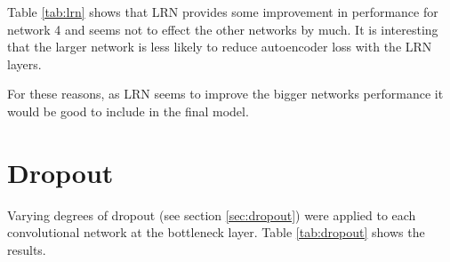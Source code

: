           Table \ref{tab:lrn} shows that LRN provides some improvement in performance for network 4 and seems
          not to effect the other networks by much. It is interesting that the larger network
          is less likely to reduce autoencoder loss with the LRN layers.

          For these reasons, as LRN seems to improve the bigger networks performance it
          would be good to include in the final model.

          \newpage
        \newpage
        \section{Dropout}
          Varying degrees of dropout (see section \ref{sec:dropout}) were applied to each convolutional
          network at the bottleneck layer.
          Table \ref{tab:dropout} shows the results.
